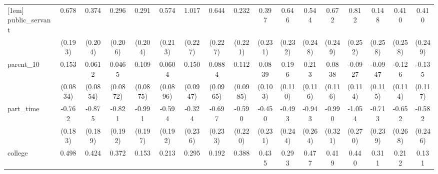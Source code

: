 {\begin{tabular}{l*{16}{c}}
[1em]
public\_servant      &       0.678\sym{***}&       0.374         &       0.296         &       0.291         &       0.574\sym{**} &       1.017\sym{***}&       0.644\sym{**} &       0.232         &       0.397         &       0.646\sym{**} &       0.544\sym{*}  &       0.672\sym{**} &       0.812\sym{**} &       0.148         &       0.410         &       0.410         \\
                    &     (0.193)         &     (0.204)         &     (0.206)         &     (0.204)         &     (0.213)         &     (0.227)         &     (0.227)         &     (0.221)         &     (0.231)         &     (0.232)         &     (0.248)         &     (0.249)         &     (0.252)         &     (0.258)         &     (0.258)         &     (0.249)         \\
[1em]
parent\_10           &       0.153         &      0.0612         &      0.0465         &       0.109         &      0.0604         &       0.150         &      0.0884         &       0.112         &      0.0839         &       0.196         &       0.213         &      0.0838         &     -0.0927         &     -0.0947         &      -0.126         &      -0.135         \\
                    &    (0.0834)         &    (0.0854)         &    (0.0872)         &    (0.0875)         &    (0.0896)         &    (0.0947)         &    (0.0965)         &    (0.0985)         &     (0.103)         &     (0.110)         &     (0.116)         &     (0.116)         &     (0.114)         &     (0.115)         &     (0.114)         &     (0.117)         \\
[1em]
part\_time           &      -0.762\sym{***}&      -0.875\sym{***}&      -0.821\sym{***}&      -0.991\sym{***}&      -0.594\sym{**} &      -0.324         &      -0.697\sym{**} &      -0.590\sym{**} &      -0.450         &      -0.493\sym{*}  &      -0.943\sym{***}&      -0.990\sym{**} &      -1.054\sym{***}&      -0.713\sym{**} &      -0.652\sym{*}  &      -0.582\sym{*}  \\
                    &     (0.183)         &     (0.189)         &     (0.192)         &     (0.197)         &     (0.192)         &     (0.236)         &     (0.233)         &     (0.220)         &     (0.231)         &     (0.244)         &     (0.264)         &     (0.321)         &     (0.270)         &     (0.239)         &     (0.268)         &     (0.246)         \\
[1em]
college             &       0.498\sym{***}&       0.424\sym{***}&       0.372\sym{***}&       0.153         &       0.213         &       0.295\sym{*}  &       0.192         &       0.388\sym{**} &       0.435\sym{**} &       0.293\sym{*}  &       0.477\sym{**} &       0.419\sym{**} &       0.440\sym{**} &       0.311\sym{*}  &       0.212         &       0.131         \\

\end{tabular}}

